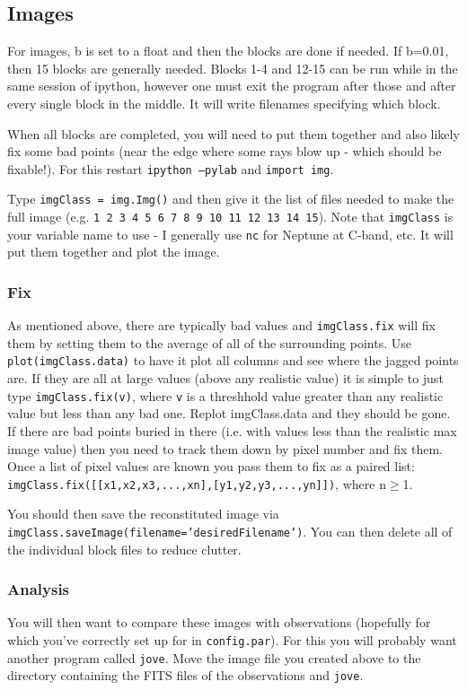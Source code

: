 \documentclass[11pt]{article}
\begin{document}
\subsection{Images}
For images, b is set to a float and then the blocks are done if needed.  If b=0.01, then 15 blocks are generally needed.  Blocks 1-4 and 12-15 can be run while in the same session of ipython, however one must exit the program after those and after every single block in the middle.  It will write filenames specifying which block.

When all blocks are completed, you will need to put them together and also likely fix some bad points (near the edge where some rays blow up - which should be fixable!).  For this restart \texttt{ipython --pylab} and \texttt{import img}.

Type \texttt{imgClass = img.Img()} and then give it the list of files needed to make the full image (e.g. \texttt{1 2 3 4 5 6 7 8 9 10 11 12 13 14 15}). Note that \texttt{imgClass} is your variable name to use - I generally use \texttt{nc} for Neptune at C-band, etc.  It will put them together and plot the image.    

\subsubsection{Fix}
As mentioned above, there are typically bad values and \texttt{imgClass.fix} will fix them by setting them to the average of all of the surrounding points.
Use \texttt{plot(imgClass.data)} to have it plot all columns and see where the jagged points are.  If they are all at large values (above any realistic value) it is simple to just type \texttt{imgClass.fix(v)}, where \texttt{v} is a threshhold value greater than any realistic value but less than any bad one.  Replot imgClass.data and they should be gone.  If there are bad points buried in there (i.e. with values less than the realistic max image value) then you need to track them down by pixel number and fix them.  Once a list of pixel values are known you pass them to fix as a paired list:  \texttt{imgClass.fix([[x1,x2,x3,...,xn],[y1,y2,y3,...,yn]])}, where n$\ge$1.

You should then save the reconstituted image via \texttt{imgClass.saveImage(filename='desiredFilename')}.  You can then delete all of the individual block files to reduce clutter.

\subsubsection{Analysis}
You will then want to compare these images with observations (hopefully for which you've correctly set up for in \texttt{config.par}).  For this you will probably want another program called \texttt{jove}.  Move the image file you created above to the directory containing the FITS files of the observations and \texttt{jove}.
\end{document}
